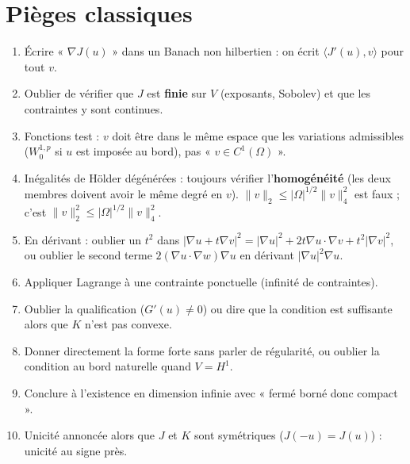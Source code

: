 \documentclass[10pt,a4paper]{article}
\newcommand{\sca}[2]{\langle #1,#2\rangle}
\newcommand{\nr}[1]{\|#1\|}
\begin{document}
\section{Pièges classiques}
\begin{enumerate}
\item Écrire « $\nabla J(u)$ » dans un Banach non hilbertien : on écrit $\sca{J'(u)}v$ pour tout $v$.
\item Oublier de vérifier que $J$ est \textbf{finie} sur $V$ (exposants, Sobolev) et que les contraintes y sont continues.
\item Fonctions test : $v$ doit être dans le même espace que les variations admissibles ($W^{1,p}_0$ si $u$ est imposée au bord), pas « $v\in C^1(\Omega)$ ».
\item Inégalités de Hölder dégénérées : toujours vérifier l'\textbf{homogénéité} (les deux membres doivent avoir le même degré en $v$). $\nr v_2\le|\Omega|^{1/2}\nr v_4^2$ est faux ; c'est $\nr v_2^2\le|\Omega|^{1/2}\nr v_4^2$.
\item En dérivant : oublier un $t^2$ dans $|\nabla u+t\nabla v|^2=|\nabla u|^2+2t\nabla u\cdot\nabla v+t^2|\nabla v|^2$, ou oublier le second terme $2(\nabla u\cdot\nabla w)\nabla u$ en dérivant $|\nabla u|^2\nabla u$.
\item Appliquer Lagrange à une contrainte ponctuelle (infinité de contraintes).
\item Oublier la qualification ($G'(u)\ne0$) ou dire que la condition est suffisante alors que $K$ n'est pas convexe.
\item Donner directement la forme forte sans parler de régularité, ou oublier la condition au bord naturelle quand $V=H^1$.
\item Conclure à l'existence en dimension infinie avec « fermé borné donc compact ».
\item Unicité annoncée alors que $J$ et $K$ sont symétriques ($J(-u)=J(u)$) : unicité au signe près.
\end{enumerate}
\end{document}
